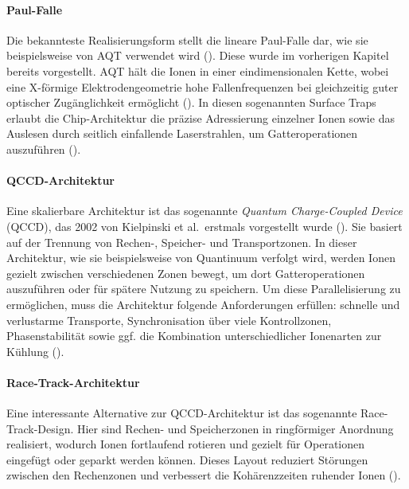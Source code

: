 \paragraph{Paul-Falle}

Die bekannteste Realisierungsform stellt die lineare Paul-Falle dar, wie sie beispielsweise von AQT verwendet wird (\cite{bischoff_wettkampf_2024}). Diese wurde im vorherigen Kapitel bereits vorgestellt. AQT hält die Ionen in einer eindimensionalen Kette, wobei eine X-förmige Elektrodengeometrie hohe Fallenfrequenzen bei gleichzeitig guter optischer Zugänglichkeit ermöglicht (\cite{frisch_trapped-ion_2024, strohmIonBasedQuantumComputing2024}). In diesen sogenannten Surface Traps erlaubt die Chip-Architektur die präzise Adressierung einzelner Ionen sowie das Auslesen durch seitlich einfallende Laserstrahlen, um Gatteroperationen auszuführen (\cite{strohmIonBasedQuantumComputing2024}).

\medskip

\paragraph{QCCD-Architektur}

Eine skalierbare Architektur ist das sogenannte \textit{Quantum Charge-Coupled Device} (QCCD), das 2002 von Kielpinski et al.\ erstmals vorgestellt wurde (\cite{kiepinski_architecture_2002}). Sie basiert auf der Trennung von Rechen-, Speicher- und Transportzonen. In dieser Architektur, wie sie beispielsweise von Quantinuum verfolgt wird, werden Ionen gezielt zwischen verschiedenen Zonen bewegt, um dort Gatteroperationen auszuführen oder für spätere Nutzung zu speichern. Um diese Parallelisierung zu ermöglichen, muss die Architektur folgende Anforderungen erfüllen: schnelle und verlustarme Transporte, Synchronisation über viele Kontrollzonen, Phasenstabilität sowie ggf. die Kombination unterschiedlicher Ionenarten zur Kühlung (\cite{strohmIonBasedQuantumComputing2024}).

\medskip

\paragraph{Race-Track-Architektur}

Eine interessante Alternative zur QCCD-Architektur ist das sogenannte Race-Track-Design. Hier sind Rechen- und Speicherzonen in ringförmiger Anordnung realisiert, wodurch Ionen fortlaufend rotieren und gezielt für Operationen eingefügt oder geparkt werden können. Dieses Layout reduziert Störungen zwischen den Rechenzonen und verbessert die Kohärenzzeiten ruhender Ionen (\cite{strohmIonBasedQuantumComputing2024}).

